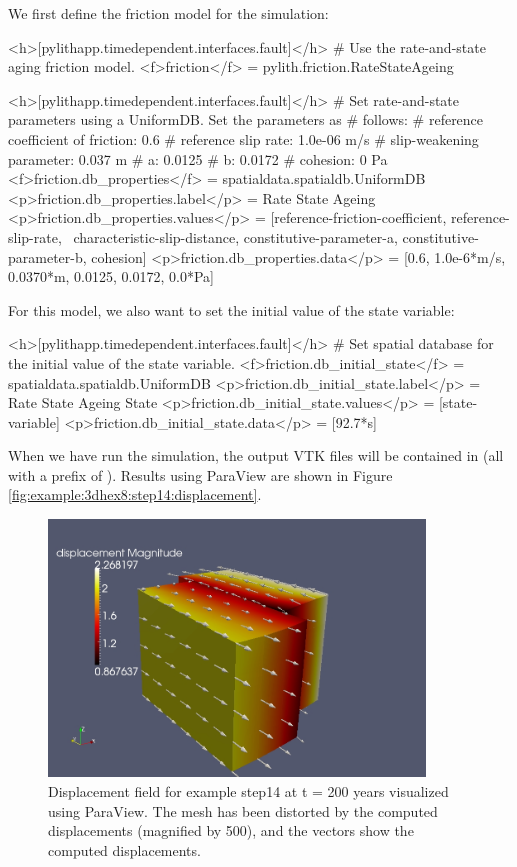 We first define the friction model for the simulation:
\begin{cfg}
<h>[pylithapp.timedependent.interfaces.fault]</h>
# Use the rate-and-state aging friction model.
<f>friction</f> = pylith.friction.RateStateAgeing

<h>[pylithapp.timedependent.interfaces.fault]</h>
# Set rate-and-state parameters using a UniformDB. Set the parameters as
# follows:
# reference coefficient of friction: 0.6
# reference slip rate: 1.0e-06 m/s
# slip-weakening parameter: 0.037 m
# a: 0.0125
# b: 0.0172
# cohesion: 0 Pa
<f>friction.db_properties</f> = spatialdata.spatialdb.UniformDB
<p>friction.db_properties.label</p> = Rate State Ageing
<p>friction.db_properties.values</p> = [reference-friction-coefficient, reference-slip-rate, \
  characteristic-slip-distance, constitutive-parameter-a, constitutive-parameter-b, cohesion]
<p>friction.db_properties.data</p> = [0.6, 1.0e-6*m/s, 0.0370*m, 0.0125, 0.0172, 0.0*Pa]
\end{cfg}
For this model, we also want to set the initial value of the state
variable:
\begin{cfg}
<h>[pylithapp.timedependent.interfaces.fault]</h>
# Set spatial database for the initial value of the state variable.
<f>friction.db_initial_state</f> = spatialdata.spatialdb.UniformDB
<p>friction.db_initial_state.label</p> = Rate State Ageing State
<p>friction.db_initial_state.values</p> = [state-variable]
<p>friction.db_initial_state.data</p> = [92.7*s]
\end{cfg}
When we have run the simulation, the output VTK files will be contained
in \filename{examples/3d/hex8/output} (all with a prefix of ).
Results using ParaView are shown in Figure \vref{fig:example:3dhex8:step14:displacement}.

\begin{figure}
  \includegraphics[width=10cm]{examples/figs/3dhex8_step14-displ-t200}
  \caption{Displacement field for example step14 at t = 200 years visualized
    using ParaView. The mesh has been distorted by the computed displacements
    (magnified by 500), and the vectors show the computed displacements.}
  \label{fig:example:3dhex8:step14:displacement}
\end{figure}

